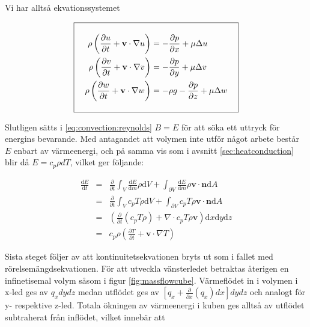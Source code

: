 
Vi har alltså ekvationssystemet

\begin{equation}
\label{eq:convection:momentum}
\addtolength{\fboxsep}{10pt} 
\boxed{ 
\begin{aligned} 
\rho\left(\frac{\partial u}{\partial t} + \mathbf{v}\cdot \nabla u\right) & = -\frac{\partial p}{\partial x} + \mu\Delta u\\
\rho\left(\frac{\partial v}{\partial t} + \mathbf{v}\cdot \nabla v\right) & = -\frac{\partial p}{\partial y} + \mu\Delta v\\
\rho\left(\frac{\partial w}{\partial t} + \mathbf{v}\cdot \nabla w\right) & = -\rho g -\frac{\partial p}{\partial z} + \mu\Delta w  
\end{aligned} 
} 
\end{equation}


Slutligen sätts i \ref{eq:convection:reynolds} $B=E$ för att söka ett uttryck för energins bevarande. Med antagandet att volymen inte utför något arbete består $E$ enbart av värmeenergi, och på samma vis som i avsnitt
\ref{sec:heatconduction} blir då $E = c_p \rho dT$, vilket ger följande:

\begin{eqnarray}
\label{reynoldsenergyone}
\frac{\mathrm{d}E}{\mathrm{d}t} & = & \frac{\partial}{\partial t} \int_V \frac{\mathrm{d}E}{\mathrm{d}m}\rho \mathrm{d}V + \int_{\partial V}\frac{\mathrm{d}E}{\mathrm{d}m}\rho \mathbf{v} \cdot \mathbf{n} \mathrm{d}A \nonumber\\
& = & \frac{\partial}{\partial t} \int_V c_p T \rho \mathrm{d}V + \int_{\partial V} c_p T \rho \mathbf{v} \cdot \mathbf{n} \mathrm{d}A \nonumber\\
& = & \left(\frac{\partial}{\partial t} \left( c_p T \rho \right) + \nabla\cdot c_p T \rho \mathbf{v}\right) \mathrm{d}x\mathrm{d}y\mathrm{d}z \nonumber\\
& = & c_p \rho \left( \frac{\partial T}{\partial t} + \mathbf{v}\cdot \nabla T\right)
\end{eqnarray}

Sista steget följer av att kontinuitetsekvationen bryts ut som i fallet med rörelsemängdsekvationen. För att utveckla vänsterledet betraktas återigen en infinetisemal volym såsom i figur \ref{fig:massflowcube}. Värmeflödet in i volymen i x-led ges av $q_x dy dz$ medan utflödet ges av $\left[ q_x + \frac{\partial}{\partial x} \left( q_x\right)dx\right]dydz$ och analogt för y- respektive z-led. Totala ökningen av värmeenergi i kuben ges alltså av utflödet subtraherat från inflödet, vilket innebär att

